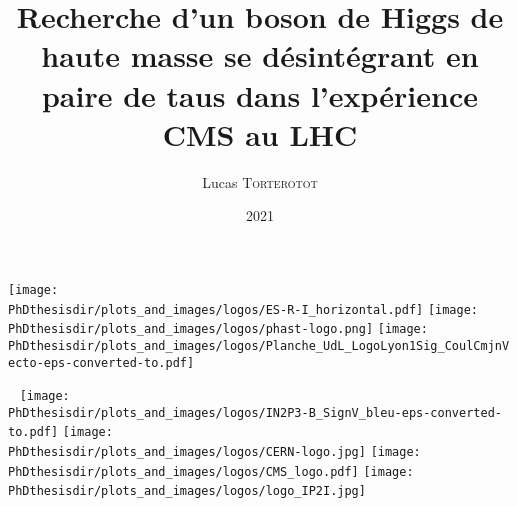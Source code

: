 \documentclass[10pt,aspectratio=169]{beamer}
\institute[IP2I]{Institut de Physique des deux Infinis -- Lyon} %
\title[Recherche d'un boson de Higgs de haute masse se désintégrant en paire de taus ...]{Recherche d'un boson de Higgs de haute masse se désintégrant en paire de taus dans l'expérience CMS au LHC}
\author[Lucas \textsc{Torterotot} -- \mailto{lucas.torterotot@ipnl.in2p3.fr}]{Lucas \textsc{Torterotot}}
\date{\todo{XX xxxx} 2021}
\newcounter{totalframes}
\begin{document}
\begin{frame}[noframenumbering] \thispagestyle{empty}
\vspace{-.75cm}

\texttt{[image: \\PhDthesisdir/plots\_and\_images/logos/ES-R-I\_horizontal.pdf]}
\hfill
\texttt{[image: \\PhDthesisdir/plots\_and\_images/logos/phast-logo.png]}
\hfill
\texttt{[image: \\PhDthesisdir/plots\_and\_images/logos/Planche\_UdL\_LogoLyon1Sig\_CoulCmjnVecto-eps-converted-to.pdf]}

\vfill

\titlepage

\vfill

~ \hfill
\texttt{[image: \\PhDthesisdir/plots\_and\_images/logos/IN2P3-B\_SignV\_bleu-eps-converted-to.pdf]}
\hfill
\texttt{[image: \\PhDthesisdir/plots\_and\_images/logos/CERN-logo.jpg]}
\hfill
\texttt{[image: \\PhDthesisdir/plots\_and\_images/logos/CMS\_logo.pdf]}
\hfill
\texttt{[image: \\PhDthesisdir/plots\_and\_images/logos/logo\_IP2I.jpg]}
\hfill ~

\vspace{-.5cm}
\end{frame}

\begin{frame}
\tableofcontents 
\end{frame}



\begin{frame}\thispagestyle{empty}
\begin{center}
{\large \color{CERNblue}{Thank you for your attention!}}

\vspace{.25\textheight}
\end{center}
\end{frame}

\setcounter{totalframes}{\theframenumber}



\setcounter{framenumber}{\thetotalframes}
\end{document}
